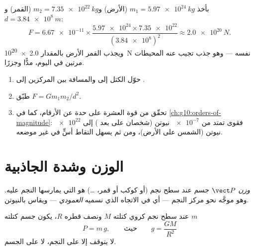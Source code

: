 \begin{example}\label{ex:g10:universal-gravitation:earthmoon}
بأخذ $m_1 = \qty{5.97e24}{kg}$ (الأرض) و$m_2 = \qty{7.35e22}{kg}$ (القمر)
و$d = \qty{3.84e8}{m}$:
\[
F = \num{6.67e-11} \times
\frac{\num{5.97e24} \times \num{7.35e22}}{(\num{3.84e8})^2}
\approx \qty{2.0e20}{N}.
\]
ويجذب القمر الأرض بالمقدار \qty{2.0e20}{N} نفسه --- وهو
جذب تجيب عنه المحيطات مرتين في اليوم، مدًّا وجزرًا.
\end{example}

\begin{method}\label{met:g10:universal-gravitation:compute}
\begin{enumerate}
  \item حوّل الكتل إلى  والمسافة بين المركزين
        إلى .
  \item طبّق $F = G m_1 m_2 / d^2$.
  \item تحقّق من قوة العشرة على حدة عن الأرقام، كما في
        \cref{ch:g10:orders-of-magnitude}: فقوى  تمتد
        من $\num{e-7}$ نيوتن (شخصان على بعد ) إلى $\num{e22}$ نيوتن
        (الشمس على الأرض)، ومن ثم يسهل التقاط أسٍّ في غير موضعه.
\end{enumerate}
\end{method}

\section{الوزن وشدة الجاذبية}

\begin{definition}[الوزن]\label{def:g10:universal-gravitation:weight}
\emph{وزن} $\vect P$ جسم عند سطح
نجم (أو كوكب أو قمر، \dots) هو  التي يمارسها النجم
عليه. وهو موجَّه نحو مركز النجم --- أي في الاتجاه الذي نسميه
\emph{العمودي} --- ويقاس بالنيوتن.
\end{definition}

\begin{proposition}\label{prop:g10:universal-gravitation:surfaceg}
عند سطح نجم كروي كتلته $M$ ونصف قطره $R$، يكون  جسم
كتلته $m$
\[
P = m\,g,
\qquad\text{حيث}\qquad
g = \frac{G M}{R^2}
\]
لا يتوقف إلا على النجم، لا على الجسم.
\end{proposition}

